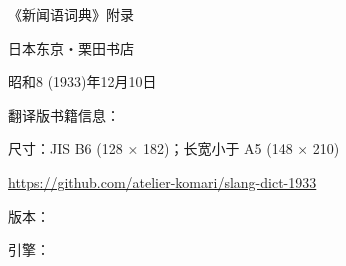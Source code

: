 
\maketitle



《新闻语词典》附录

日本东京・栗田书店

昭和8 (1933)年12月10日

\vspace*{\fill}

翻译版书籍信息：

尺寸：JIS B6 (128 × 182)；长宽小于 A5 (148 × 210)

\url{https://github.com/atelier-komari/slang-dict-1933}

版本：\gitversion

引擎：\luatexbanner

\clearpage
